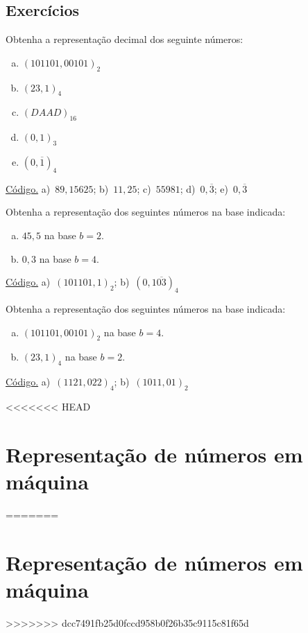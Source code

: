 \subsection{Exercícios}

\begin{exer}\label{exer:base2dec}
  Obtenha a representação decimal dos seguinte números:
  \begin{enumerate}[a)]
  \item $(101101,00101)_2$
  \item $(23,1)_4$
  \item $(DAAD)_{16}$
  \item $(0,1)_3$
  \item $(0,\overline{1})_4$
  \end{enumerate}
\end{exer}
\begin{resp}
    \ifisoctave 
  \href{https://github.com/phkonzen/notas/blob/master/src/MatematicaNumerica/cap_aritm/dados/exer_base2dec/exer_base2dec.m}{Código.} 
  \fi
  a)~$89,15625$; b)~$11,25$; c)~$55981$; d)~$0,\overline{3}$; e)~$0,\overline{3}$
\end{resp}

\begin{exer}\label{exer_dec2base}
  Obtenha a representação dos seguintes números na base indicada:
  \begin{enumerate}[a)]
  \item $45,5$ na base $b=2$.
  \item $0,3$ na base $b=4$.
  \end{enumerate}
\end{exer}
\begin{resp}
  \ifisoctave 
  \href{https://github.com/phkonzen/notas/blob/master/src/MatematicaNumerica/cap_aritm/dados/exer_dec2base/exer_dec2base.m}{Código.} 
  \fi
  a)~$(101101,1)_2$; b)~$(0,1\overline{03})_4$
\end{resp}

\begin{exer}\label{exer_base2base}
  Obtenha a representação dos seguintes números na base indicada:
  \begin{enumerate}[a)]
  \item $(101101,00101)_2$ na base $b=4$.
  \item $(23,1)_4$ na base $b=2$.
  \end{enumerate}
\end{exer}
\begin{resp}
  \ifisoctave 
  \href{https://github.com/phkonzen/notas/blob/master/src/MatematicaNumerica/cap_aritm/dados/exer_base2base/exer_base2base.m}{Código.} 
  \fi
  a)~$(1121,022)_4$; b)~$(1011,01)_2$  
\end{resp}

<<<<<<< HEAD
\section{Representação de números em máquina}\label{cap_aritm_sec_nummaq}
=======
\section{Representação de números em máquina}\label{cap_artm_sec_repummaq}
>>>>>>> dcc7491fb25d0fccd958b0f26b35c9115c81f65d

\emconstrucao